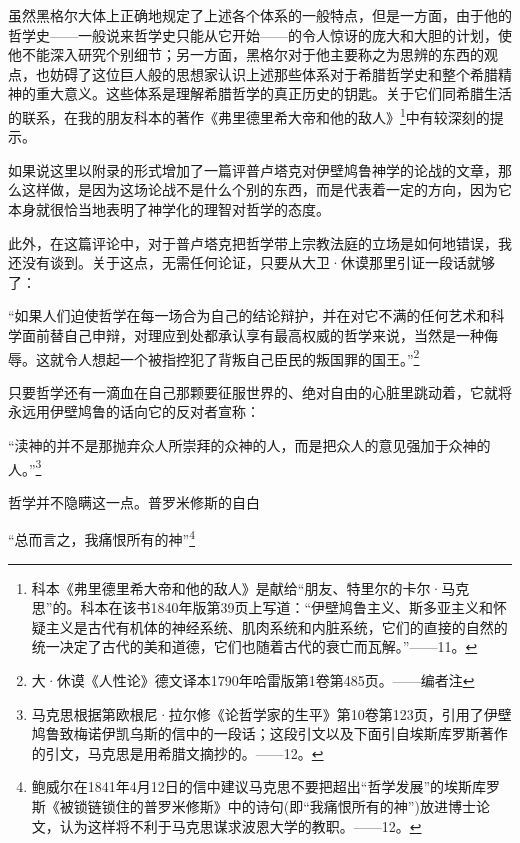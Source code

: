 \documentclass[a4paper,twoside,12pt,AutoFakeBold]{ctexart}
\begin{document}
虽然黑格尔大体上正确地规定了上述各个体系的一般特点，但是一方面，由于他的哲学史——一般说来哲学史只能从它开始——的令人惊讶的庞大和大胆的计划，使他不能深入研究个别细节；另一方面，黑格尔对于他主要称之为思辨的东西的观点，也妨碍了这位巨人般的思想家认识上述那些体系对于希腊哲学史和整个希腊精神的重大意义。这些体系是理解希腊哲学的真正历史的钥匙。关于它们同希腊生活的联系，在我的朋友科本的著作《弗里德里希大帝和他的敌人》\footnote{科本《弗里德里希大帝和他的敌人》是献给“朋友、特里尔的卡尔·马克思”的。科本在该书1840年版第39页上写道：“伊壁鸠鲁主义、斯多亚主义和怀疑主义是古代有机体的神经系统、肌肉系统和内脏系统，它们的直接的自然的统一决定了古代的美和道德，它们也随着古代的衰亡而瓦解。”——11。}中有较深刻的提示。

如果说这里以附录的形式增加了一篇评普卢塔克对伊壁鸠鲁神学的论战的文章，那么这样做，是因为这场论战不是什么个别的东西，而是代表着一定的方向，因为它本身就很恰当地表明了神学化的理智对哲学的态度。

此外，在这篇评论中，对于普卢塔克把哲学带上宗教法庭的立场是如何地错误，我还没有谈到。关于这点，无需任何论证，只要从大卫·休谟那里引证一段话就够了：

\begin{fangsong}
    “如果人们迫使哲学在每一场合为自己的结论辩护，并在对它不满的任何艺术和科学面前替自己申辩，对理应到处都承认享有最高权威的哲学来说，当然是一种侮辱。这就令人想起一个被指控犯了背叛自己臣民的叛国罪的国王。”\footnote{大·休谟《人性论》德文译本1790年哈雷版第1卷第485页。——编者注}
\end{fangsong}

只要哲学还有一滴血在自己那颗要征服世界的、绝对自由的心脏里跳动着，它就将永远用伊壁鸠鲁的话向它的反对者宣称：

\begin{fangsong}
    “渎神的并不是那抛弃众人所崇拜的众神的人，而是把众人的意见强加于众神的人。”\footnote{马克思根据第欧根尼·拉尔修《论哲学家的生平》第10卷第123页，引用了伊壁鸠鲁致梅诺伊凯乌斯的信中的一段话；这段引文以及下面引自埃斯库罗斯著作的引文，马克思是用希腊文摘抄的。——12。}
\end{fangsong}

哲学并不隐瞒这一点。普罗米修斯的自白

\begin{fangsong}
    “总而言之，我痛恨所有的神”\footnote{鲍威尔在1841年4月12日的信中建议马克思不要把超出“哲学发展”的埃斯库罗斯《被锁链锁住的普罗米修斯》中的诗句(即“我痛恨所有的神”)放进博士论文，认为这样将不利于马克思谋求波恩大学的教职。——12。}
\end{fangsong}
\end{document}
